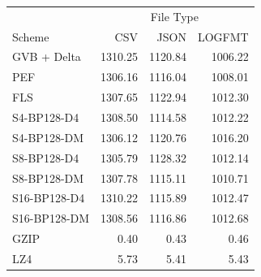 \begin{tabular}{lrrr}
\toprule
 & \multicolumn{3}{c}{File Type} \\
Scheme & CSV & JSON & LOGFMT \\
\midrule
GVB + Delta & 1310.25 & 1120.84 & 1006.22 \\
PEF & 1306.16 & 1116.04 & 1008.01 \\
FLS & 1307.65 & 1122.94 & 1012.30 \\
S4-BP128-D4 & 1308.50 & 1114.58 & 1012.22 \\
S4-BP128-DM & 1306.12 & 1120.76 & 1016.20 \\
S8-BP128-D4 & 1305.79 & 1128.32 & 1012.14 \\
S8-BP128-DM & 1307.78 & 1115.11 & 1010.71 \\
S16-BP128-D4 & 1310.22 & 1115.89 & 1012.47 \\
S16-BP128-DM & 1308.56 & 1116.86 & 1012.68 \\
GZIP & 0.40 & 0.43 & 0.46 \\
LZ4 & 5.73 & 5.41 & 5.43 \\
\bottomrule
\end{tabular}
